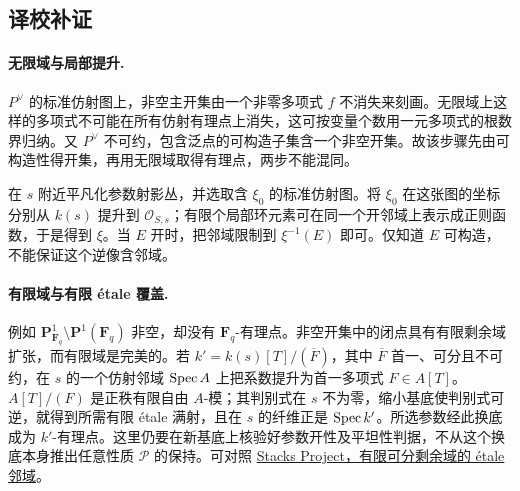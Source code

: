 \endgroup


\hypertarget{D18-097-notes}{}
\begingroup
\def\OO{\mathcal O}\def\FF{\mathcal F}\def\GG{\mathcal G}
\def\PP{\mathbf P}\def\calP{\mathcal P}\def\dd{\delta}
\def\Div{\operatorname{Div}}\def\depth{\operatorname{depth}}
\def\pr{\operatorname{pr}}\def\coker{\operatorname{coker}}
\subsection*{译校补证}
\paragraph{无限域与局部提升.}
$P^\vee$ 的标准仿射图上，非空主开集由一个非零多项式 $f$ 不消失来刻画。无限域上这样的多项式不可能在所有仿射有理点上消失，这可按变量个数用一元多项式的根数界归纳。又 $P^\vee$ 不可约，包含泛点的可构造子集含一个非空开集。故该步骤先由可构造性得开集，再用无限域取得有理点，两步不能混同。

在 $s$ 附近平凡化参数射影丛，并选取含 $\xi_0$ 的标准仿射图。将 $\xi_0$ 在这张图的坐标分别从 $k(s)$ 提升到 $\mathcal O_{S,s}$；有限个局部环元素可在同一个开邻域上表示成正则函数，于是得到 $\xi$。当 $E$ 开时，把邻域限制到 $\xi^{-1}(E)$ 即可。仅知道 $E$ 可构造，不能保证这个逆像含邻域。

\paragraph{有限域与有限 \'{e}tale 覆盖.}
例如 $\mathbf P^1_{\mathbf F_q}\setminus\mathbf P^1(\mathbf F_q)$ 非空，却没有 $\mathbf F_q$-有理点。非空开集中的闭点具有有限剩余域扩张，而有限域是完美的。若 $k'=k(s)[T]/(\overline F)$，其中 $\overline F$ 首一、可分且不可约，在 $s$ 的一个仿射邻域 $\operatorname{Spec} A$ 上把系数提升为首一多项式 $F\in A[T]$。$A[T]/(F)$ 是正秩有限自由 $A$-模；其判别式在 $s$ 不为零，缩小基底使判别式可逆，就得到所需有限 étale 满射，且在 $s$ 的纤维正是 $\operatorname{Spec} k'$。所选参数经此换底成为 $k'$-有理点。这里仍要在新基底上核验好参数开性及平坦性判据，不从这个换底本身推出任意性质 $\calP$ 的保持。可对照 \href{https://stacks.math.columbia.edu/tag/02LF}{Stacks Project，有限可分剩余域的 étale 邻域}。

\endgroup


\hypertarget{D18-098-notes}{}
\begingroup
\def\OO{\mathcal O}\def\FF{\mathcal F}\def\GG{\mathcal G}
\def\PP{\mathbf P}\def\calP{\mathcal P}\def\dd{\delta}
\def\Div{\operatorname{Div}}\def\depth{\operatorname{depth}}
\def\pr{\operatorname{pr}}\def\coker{\operatorname{coker}}
